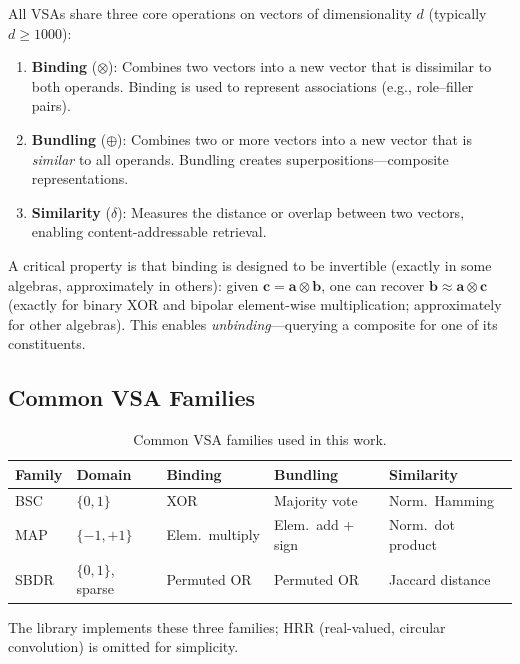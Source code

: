 \documentclass[11pt]{article}
\begin{document}
All VSAs share three core operations on vectors of dimensionality $d$ (typically $d \geq 1000$):

\begin{enumerate}
    \item \textbf{Binding} ($\otimes$): Combines two vectors into a new vector that is dissimilar to both operands. Binding is used to represent associations (e.g., role--filler pairs).
    \item \textbf{Bundling} ($\oplus$): Combines two or more vectors into a new vector that is \textit{similar} to all operands. Bundling creates superpositions---composite representations.
    \item \textbf{Similarity} ($\delta$): Measures the distance or overlap between two vectors, enabling content-addressable retrieval.
\end{enumerate}

A critical property is that binding is designed to be invertible (exactly in some algebras, approximately in others): given $\mathbf{c} = \mathbf{a} \otimes \mathbf{b}$, one can recover $\mathbf{b} \approx \mathbf{a} \otimes \mathbf{c}$ (exactly for binary XOR and bipolar element-wise multiplication; approximately for other algebras). This enables \textit{unbinding}---querying a composite for one of its constituents.

\subsection{Common VSA Families}

\begin{table}[h]
\centering
\caption{Common VSA families used in this work.}
\label{tab:vsa_families}
\begin{tabular}{@{}lllll@{}}
\toprule
\textbf{Family} & \textbf{Domain} & \textbf{Binding} & \textbf{Bundling} & \textbf{Similarity} \\
\midrule
BSC & $\{0,1\}$ & XOR & Majority vote & Norm.\ Hamming \\
MAP & $\{-1,+1\}$ & Elem.\ multiply & Elem.\ add + sign & Norm.\ dot product \\
SBDR & $\{0,1\}$, sparse & Permuted OR & Permuted OR & Jaccard distance \\
\bottomrule
\end{tabular}
\end{table}

The library implements these three families; HRR (real-valued, circular convolution) is omitted for simplicity.
\end{document}
